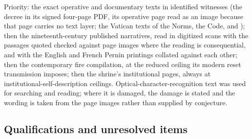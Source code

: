 Priority: the exact operative and documentary texts in identified
witnesses (the decree in its signed four-page PDF, its operative page
read as an image because that page carries no text layer; the Vatican
texts of the Norms, the Code, and ); then the
nineteenth-century published narratives, read in digitized scans with
the passages quoted checked against page images where the reading is
consequential, and with the English and French Pernin printings
collated against each other; then the contemporary fire compilation, at
the reduced ceiling its modern reset transmission imposes; then the
shrine's institutional pages, always at institutional-self-description
ceilings. Optical-character-recognition text was used for searching and
reading; where it is damaged, the damage is stated and the wording is
taken from the page images rather than supplied by conjecture.

\subsection*{Qualifications and unresolved items}

